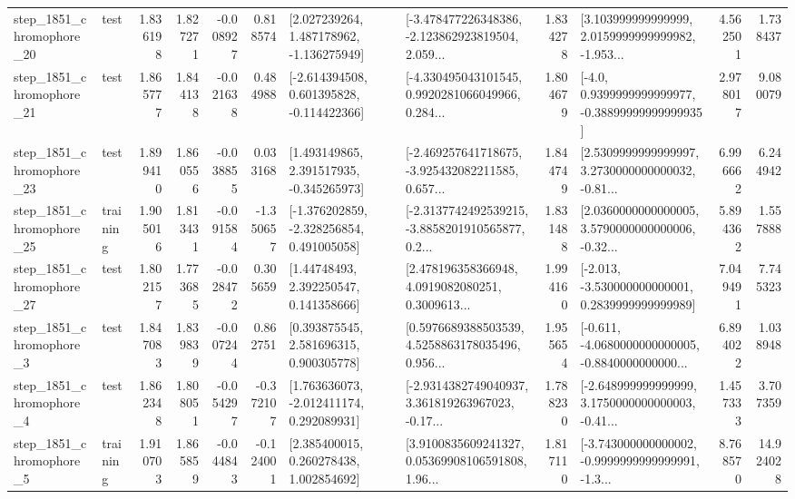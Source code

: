 \begin{tabular}{llrrrrllrlrr}
 step\_1851\_chromophore\_20 &      test &      1.836198 &    1.827271 &     -0.008927 &  0.818574 &    [2.027239264, 1.487178962, -1.136275949] &  [-3.478477226348386, -2.123862923819504, 2.059... &       1.834278 &  [3.103999999999999, 2.0159999999999982, -1.953... &            4.562501 &          1.738437 \\
 step\_1851\_chromophore\_21 &      test &      1.865777 &    1.844138 &     -0.021638 &  0.484988 &   [-2.614394508, 0.601395828, -0.114422366] &  [-4.330495043101545, 0.9920281066049966, 0.284... &       1.804679 &   [-4.0, 0.9399999999999977, -0.38899999999999935] &            2.978017 &          9.080079 \\
 step\_1851\_chromophore\_23 &      test &      1.899410 &    1.860556 &     -0.038855 &  0.033168 &    [1.493149865, 2.391517935, -0.345265973] &  [-2.469257641718675, -3.925432082211585, 0.657... &       1.844749 &  [2.5309999999999997, 3.2730000000000032, -0.81... &            6.996662 &          6.244942 \\
 step\_1851\_chromophore\_25 &  training &      1.905016 &    1.813431 &     -0.091584 & -1.350657 &   [-1.376202859, -2.328256854, 0.491005058] &  [-2.3137742492539215, -3.8858201910565877, 0.2... &       1.831488 &  [2.0360000000000005, 3.5790000000000006, -0.32... &            5.894362 &          1.557888 \\
 step\_1851\_chromophore\_27 &      test &      1.802157 &    1.773685 &     -0.028472 &  0.305659 &      [1.44748493, 2.392250547, 0.141358666] &  [2.478196358366948, 4.0919082080251, 0.3009613... &       1.994160 &   [-2.013, -3.530000000000001, 0.2839999999999989] &            7.049491 &          7.745323 \\
  step\_1851\_chromophore\_3 &      test &      1.847083 &    1.839839 &     -0.007244 &  0.862751 &     [0.393875545, 2.581696315, 0.900305778] &  [0.5976689388503539, 4.5258863178035496, 0.956... &       1.955654 &  [-0.611, -4.0680000000000005, -0.8840000000000... &            6.894022 &          1.038948 \\
  step\_1851\_chromophore\_4 &      test &      1.862348 &    1.808051 &     -0.054297 & -0.372107 &    [1.763636073, -2.012411174, 0.292089931] &  [-2.9314382749040937, 3.361819263967023, -0.17... &       1.788230 &  [-2.648999999999999, 3.1750000000000003, -0.41... &            1.457333 &          3.707359 \\
  step\_1851\_chromophore\_5 &  training &      1.910703 &    1.865859 &     -0.044843 & -0.124001 &     [2.385400015, 0.260278438, 1.002854692] &  [3.9100835609241327, 0.05369908106591808, 1.96... &       1.817110 &  [-3.743000000000002, -0.9999999999999991, -1.3... &            8.768570 &         14.924028 \\

\end{tabular}
